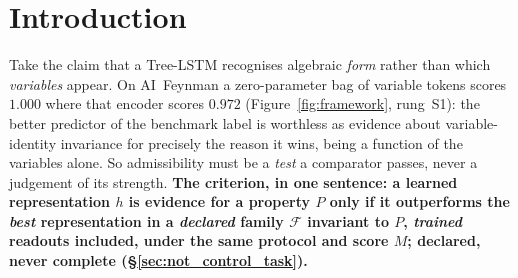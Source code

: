 \section{Introduction}
\label{sec:introduction}

Take the claim that a Tree-LSTM recognises algebraic \emph{form} rather than which \emph{variables} appear. On AI~Feynman a zero-parameter bag of variable tokens scores $\mathbf{1.000}$ where that encoder scores $0.972$ (Figure~\ref{fig:framework}, rung~S1): the better predictor of the benchmark label is worthless as evidence about variable-identity invariance for precisely the reason it wins, being a function of the variables alone. So admissibility must be a \emph{test} a comparator passes, never a judgement of its strength. \textbf{The criterion, in one sentence: a learned representation $h$ is evidence for a property $P$ only if it outperforms the \emph{best} representation in a \emph{declared} family $\mathcal{F}$ invariant to $P$, \emph{trained} readouts included, under the same protocol and score $M$; declared, never complete (\S\ref{sec:not_control_task}).}
